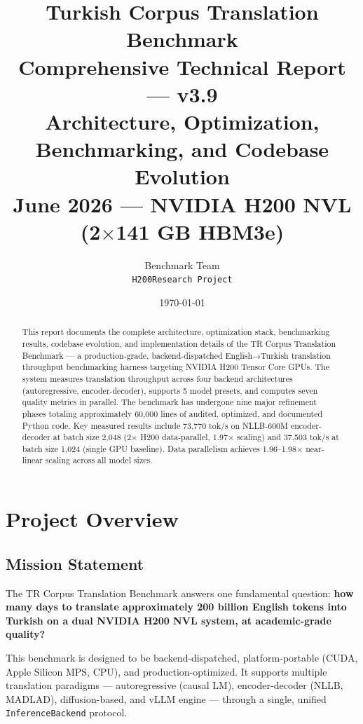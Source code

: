 \documentclass[11pt,a4paper,twoside]{article}
\title{%
  \huge\textbf{Turkish Corpus Translation Benchmark}\\[4pt]
  \Large\textbf{Comprehensive Technical Report — v3.9}\\[12pt]
  \normalsize Architecture, Optimization, Benchmarking, and Codebase Evolution\\
  \normalsize June 2026 --- NVIDIA H200 NVL (2$\times$141 GB HBM3e)
}
\author{%
  Benchmark Team\\
  \texttt{H200Research Project}
}
\date{\today}
\begin{document}
\maketitle

\begin{abstract}
This report documents the complete architecture, optimization stack, benchmarking
results, codebase evolution, and implementation details of the TR Corpus Translation
Benchmark --- a production-grade, backend-dispatched English→Turkish translation throughput
benchmarking harness targeting NVIDIA H200 Tensor Core GPUs. The system measures
translation throughput across four backend architectures (autoregressive,
encoder-decoder), supports 5 model presets, and computes
seven quality metrics in parallel. The benchmark has undergone nine major
refinement phases totaling approximately 60,000 lines of audited, optimized, and
documented Python code. Key measured results include 73,770 tok/s on NLLB-600M encoder-decoder
at batch size 2,048 (2× H200 data-parallel, 1.97× scaling) and 37,503 tok/s at
batch size 1,024 (single GPU baseline). Data parallelism achieves 1.96--1.98×
near-linear scaling across all model sizes.
\end{abstract}

\tableofcontents
\newpage

\section{Project Overview}

\subsection{Mission Statement}

The TR Corpus Translation Benchmark answers one fundamental question: \textbf{how
many days to translate approximately 200 billion English tokens into Turkish on
a dual NVIDIA H200 NVL system, at academic-grade quality?}

This benchmark is designed to be backend-dispatched, platform-portable (CUDA, Apple
Silicon MPS, CPU), and production-optimized. It supports multiple translation
paradigms --- autoregressive (causal LM), encoder-decoder (NLLB, MADLAD),
diffusion-based, and vLLM engine --- through a single, unified \texttt{InferenceBackend}
protocol.
\end{document}
